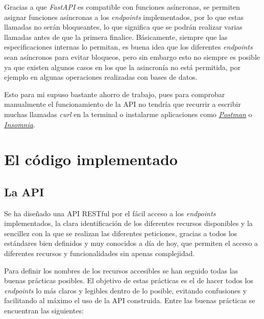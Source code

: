 Gracias a que \textit{FastAPI} es compatible con funciones asíncronas, se permiten asignar funciones asíncronas a los \textit{endpoints} implementados, por lo que estas llamadas no serán bloqueantes, lo que significa que se podrán realizar varias llamadas antes de que la primera finalice. Básicamente, siempre que las especificaciones internas lo permitan, es buena idea que los diferentes \textit{endpoints} sean asíncronos para evitar bloqueos, pero sin embargo esto no siempre es posible ya que existen algunos casos en los que la asincronía no está permitida, por ejemplo en algunas operaciones realizadas con bases de datos.

Esto para mi supuso bastante ahorro de trabajo, pues para comprobar manualmente el funcionamiento de la API no tendría que recurrir a escribir muchas llamadas \textit{curl} en la terminal o instalarme aplicaciones como \href{https://www.postman.com/}{\textit{Postman}} o \href{https://insomnia.rest/}{\textit{Insomnia}}.


\section{El código implementado}

\subsection{La API}
\label{api}

Se ha diseñado una API RESTful por el fácil acceso a los \textit{endpoints} implementados, la clara identificación de los diferentes recursos disponibles y la sencillez con la que se realizan las diferentes peticiones, gracias a todos los estándares bien definidos y muy conocidos a día de hoy, que permiten el acceso a diferentes recursos y funcionalidades sin apenas complejidad.

Para definir los nombres de los recursos accesibles se han seguido todas las buenas prácticas posibles. El objetivo de estas prácticas es el de hacer todos los \textit{endpoints} lo más claros y legibles dentro de lo posible, evitando confusiones y facilitando al máximo el uso de la API construida. Entre las buenas prácticas se encuentran las siguientes:


